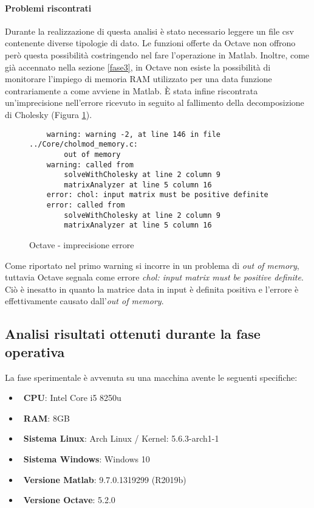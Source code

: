 \paragraph{Problemi riscontrati}
Durante la realizzazione di questa analisi è stato necessario leggere un file csv contenente diverse tipologie di dato. Le funzioni offerte da Octave non offrono però questa possibilità costringendo nel fare l'operazione in Matlab.
Inoltre, come già accennato nella sezione \ref{fase3}, in Octave non esiste la possibilità di monitorare l'impiego di memoria RAM utilizzato per una data funzione contrariamente a come avviene in Matlab.
È stata infine riscontrata un'imprecisione nell'errore ricevuto in seguito al fallimento della decomposizione di Cholesky (Figura \ref{fig:octaveImprecisione}).
\begin{figure}[H]
\centering
\begin{verbatim} 
    warning: warning -2, at line 146 in file ../Core/cholmod_memory.c:
        out of memory
    warning: called from
        solveWithCholesky at line 2 column 9
        matrixAnalyzer at line 5 column 16
    error: chol: input matrix must be positive definite
    error: called from
        solveWithCholesky at line 2 column 9
        matrixAnalyzer at line 5 column 16
\end{verbatim}
\caption{Octave - imprecisione errore}
\label{fig:octaveImprecisione}
\end{figure}
Come riportato nel primo warning si incorre in un problema di \emph{out of memory}, tuttavia Octave segnala come errore \emph{chol: input matrix must be positive definite}. Ciò è inesatto in quanto la matrice data in input è definita positiva e l'errore è effettivamente causato dall'\emph{out of memory}.

\subsection {Analisi risultati ottenuti durante la fase operativa}\label{analisiRisultati}
La fase sperimentale è avvenuta su una macchina avente le seguenti specifiche:
\begin{itemize}
    \item~\textbf{CPU}: Intel Core i5 8250u
    \item~\textbf{RAM}: 8GB
    \item~\textbf{Sistema Linux}: Arch Linux / Kernel: 5.6.3-arch1-1
    \item~\textbf{Sistema Windows}: Windows 10
    \item~\textbf{Versione Matlab}: 9.7.0.1319299 (R2019b)
    \item~\textbf{Versione Octave}: 5.2.0
\end{itemize}


